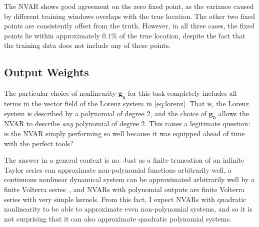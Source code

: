 The NVAR shows good agreement on the zero fixed point, as the variance
caused by different training windows overlaps with the true
location. The other two fixed points are consistently offset from the
truth. However, in all three cases, the fixed points lie within
approximately $0.1\%$ of the true location, despite the fact that the
training data does not include any of these points.

\subsection{Output Weights}

The particular choice of nonlinearity $\bm{g}_\text{n}$ for this task
completely includes all terms in the vector field of the Lorenz
system in \cref{eq:lorenz}. That is, the Lorenz system is described by
a polynomial of degree $2$, and the choice of $\bm{g}_\text{n}$ allows
the NVAR to describe \emph{any} polynomial of degree $2$. This raises
a legitimate question: is the NVAR simply performing so well because
it was equipped ahead of time with the perfect tools?

The answer in a general context is no. Just as a finite truncation of an infinite Taylor series can
approximate non-polynomial functions arbitrarily well, a continuous
nonlinear dynamical system can be approximated arbitrarily well by a
finite Volterra series~\cite{franz2006}, and NVARs with polynomial
outputs are finite Volterra series with very simple kernels. From this
fact, I expect NVARs with quadratic nonlinearity to be able to
approximate even non-polynomial systems, and so it is not surprising
that it can also approximate quadratic polynomial systems.

